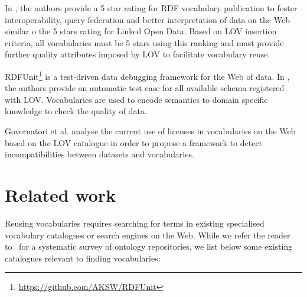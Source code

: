 \documentclass{iosart2c}
\begin{document}
In \cite{janowicz2014five}, the authors provide a 5 star rating for RDF vocabulary publication to foster interoperability, query federation and better interpretation of data on the Web similar o the 5 stars rating for Linked Open Data. Based on LOV insertion criteria, all vocabularies must be 5 stars using this ranking and must provide further quality attributes imposed by LOV to facilitate vocabulary reuse.


RDFUnit\footnote{\url{https://github.com/AKSW/RDFUnit}} is a test-driven data debugging framework for the Web of data. In \cite{rdfunit}, the authors provide an automatic test case for all available schema registered with LOV. Vocabularies are used to encode semantics to domain specific knowledge to check the quality of data.

Governatori et al. \cite{governatori2014} analyse the current use of licenses in vocabularies on the Web based on the LOV catalogue in order to propose a framework to detect incompatibilities between datasets and vocabularies.


\section{Related work}
\label{sec:related}
Reusing vocabularies requires searching for terms in existing specialised vocabulary catalogues or search engines on the Web. While we refer the reader to~\cite{AquinJoWS12} for a systematic survey of ontology repositories, we list below some existing catalogues relevant to finding vocabularies:  
\end{document}
